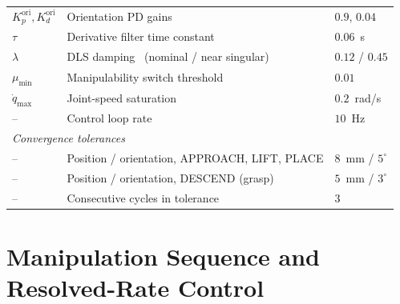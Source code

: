 \begin{table}[htbp]
{\begin{tabular}{lll}
$K_p^{\text{ori}}, K_d^{\text{ori}}$ & Orientation PD gains                                 & $0.9$, $0.04$ \\
$\tau$                   & Derivative filter time constant                                  & $0.06$~s \\
$\lambda$                & DLS damping~\citep{chiaverini1994review} (nominal / near singular) & $0.12$ / $0.45$ \\
$\mu_{\min}$             & Manipulability switch threshold                                  & $0.01$ \\
$\dot{q}_{\max}$         & Joint-speed saturation                                           & $0.2$~rad/s \\
--                       & Control loop rate                                                & $10$~Hz \\
\midrule
\multicolumn{3}{l}{\textit{Convergence tolerances}} \\
--                       & Position / orientation, APPROACH, LIFT, PLACE                     & $8$~mm / $5^\circ$ \\
--                       & Position / orientation, DESCEND (grasp)                          & $5$~mm / $3^\circ$ \\
--                       & Consecutive cycles in tolerance                                  & $3$ \\
\bottomrule
\end{tabular}%
}
\end{table}

\section{Manipulation Sequence and Resolved-Rate Control}\label{sec:sv_control}

